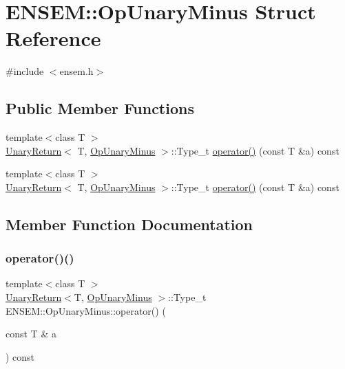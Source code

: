 \hypertarget{structENSEM_1_1OpUnaryMinus}{}\section{E\+N\+S\+EM\+:\+:Op\+Unary\+Minus Struct Reference}
\label{structENSEM_1_1OpUnaryMinus}


{\ttfamily \#include $<$ensem.\+h$>$}

\subsection*{Public Member Functions}
\begin{DoxyCompactItemize}
\item 
{\footnotesize template$<$class T $>$ }\\\mbox{\hyperlink{structENSEM_1_1UnaryReturn}{Unary\+Return}}$<$ T, \mbox{\hyperlink{structENSEM_1_1OpUnaryMinus}{Op\+Unary\+Minus}} $>$\+::Type\+\_\+t \mbox{\hyperlink{structENSEM_1_1OpUnaryMinus_a34e70d7d677f60520ca94fa732d26926}{operator()}} (const T \&a) const
\item 
{\footnotesize template$<$class T $>$ }\\\mbox{\hyperlink{structENSEM_1_1UnaryReturn}{Unary\+Return}}$<$ T, \mbox{\hyperlink{structENSEM_1_1OpUnaryMinus}{Op\+Unary\+Minus}} $>$\+::Type\+\_\+t \mbox{\hyperlink{structENSEM_1_1OpUnaryMinus_a34e70d7d677f60520ca94fa732d26926}{operator()}} (const T \&a) const
\end{DoxyCompactItemize}


\subsection{Member Function Documentation}
\mbox{\label{structENSEM_1_1OpUnaryMinus_a34e70d7d677f60520ca94fa732d26926}} 
\subsubsection{\texorpdfstring{operator()()}{operator()()}\hspace{0.1cm}{\footnotesize\ttfamily [1/2]}}
{\footnotesize\ttfamily template$<$class T $>$ \\
\mbox{\hyperlink{structENSEM_1_1UnaryReturn}{Unary\+Return}}$<$T, \mbox{\hyperlink{structENSEM_1_1OpUnaryMinus}{Op\+Unary\+Minus}} $>$\+::Type\+\_\+t E\+N\+S\+E\+M\+::\+Op\+Unary\+Minus\+::operator() (\begin{DoxyParamCaption}\item[{const T \&}]{a }\end{DoxyParamCaption}) const\hspace{0.3cm}{\ttfamily [inline]}}

